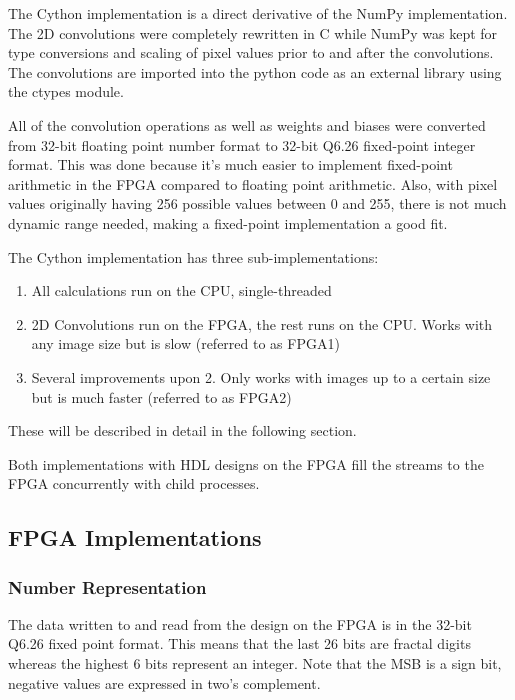\documentclass[
			fontsize = 12pt,
			paper = a4
			]
			{scrartcl}%
\newcommand{\?}{\ensuremath{^\texttt{\textbf [CITATION~NEEDED]}}}
\begin{document}
The Cython implementation is a direct derivative of the NumPy implementation. The 2D convolutions were completely rewritten in C while NumPy was kept for type conversions and scaling of pixel values prior to and after the convolutions. The convolutions are imported into the python code as an external library using the ctypes module.

All of the convolution operations as well as weights and biases were converted from 32-bit floating point number format to 32-bit Q6.26 fixed-point integer format. This was done because it's much easier to implement fixed-point arithmetic in the FPGA compared to floating point arithmetic. Also, with pixel values originally having 256 possible values between 0 and 255, there is not much dynamic range needed, making a fixed-point implementation a good fit.

The Cython implementation has three sub-implementations:

\begin{enumerate}
    \item All calculations run on the CPU, single-threaded
    \item 2D Convolutions run on the FPGA, the rest runs on the CPU. Works with any image size but is slow (referred to as FPGA1)
    \item Several improvements upon 2. Only works with images up to a certain size but is much faster (referred to as FPGA2)
\end{enumerate}

These will be described in detail in the following section.

Both implementations with HDL designs on the FPGA fill the streams to the FPGA concurrently with child processes.

\subsection{FPGA Implementations}
\label{sec:fpgaimpl}

\subsubsection{Number Representation}

The data written to and read from the design on the FPGA is in the 32-bit Q6.26 fixed point format. This means that the last 26 bits are fractal digits whereas the highest 6 bits represent an integer. Note that the MSB is a sign bit, negative values are expressed in two's complement.
\end{document}
